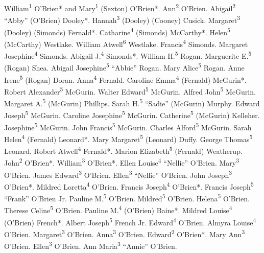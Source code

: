 William\textsuperscript{1} O'Brien* and Mary\textsuperscript{1} (Sexton) O'Brien*.
Ann\textsuperscript{2} O'Brien.
Abigail\textsuperscript{2} ``Abby'' (O'Brien) Dooley*.
Hannah\textsuperscript{3} (Dooley) (Cooney) Cusick.
Margaret\textsuperscript{3} (Dooley) (Simonds) Fernald*.
Catharine\textsuperscript{4} (Simonds) McCarthy*.
Helen\textsuperscript{5} (McCarthy) Westlake.
William Atwell\textsuperscript{6} Westlake.
Francis\textsuperscript{4} Simonds.
Margaret Josephine\textsuperscript{4} Simonds.
Abigail J.\textsuperscript{4} Simonds*.
William H.\textsuperscript{5} Rogan.
Marguerite E.\textsuperscript{5} (Rogan) Shea.
Abigail Josephine\textsuperscript{5} ``Abbie'' Rogan.
Mary Alice\textsuperscript{5} Rogan.
Anne Irene\textsuperscript{5} (Rogan) Doran.
Anna\textsuperscript{4} Fernald.
Caroline Emma\textsuperscript{4} (Fernald) McGurin*.
Robert Alexander\textsuperscript{5} McGurin.
Walter Edward\textsuperscript{5} McGurin.
Alfred John\textsuperscript{5} McGurin.
Margaret A.\textsuperscript{5} (McGurin) Phillips.
Sarah H.\textsuperscript{5} ``Sadie'' (McGurin) Murphy.
Edward Joseph\textsuperscript{5} McGurin.
Caroline Josephine\textsuperscript{5} McGurin.
Catherine\textsuperscript{5} (McGurin) Kelleher.
Josephine\textsuperscript{5} McGurin.
John Francis\textsuperscript{5} McGurin.
Charles Alford\textsuperscript{5} McGurin.
Sarah Helen\textsuperscript{4} (Fernald) Leonard*.
Mary Margaret\textsuperscript{5} (Leonard) Duffy.
George Thomas\textsuperscript{5} Leonard.
Robert Atwell\textsuperscript{4} Fernald*.
Marion Elizabeth\textsuperscript{5} (Fernald) Weatherup.
John\textsuperscript{2} O'Brien*.
William\textsuperscript{3} O'Brien*.
Ellen Louise\textsuperscript{4} ``Nellie'' O'Brien.
Mary\textsuperscript{3} O'Brien.
James Edward\textsuperscript{3} O'Brien.
Ellen\textsuperscript{3} ``Nellie'' O'Brien.
John Joseph\textsuperscript{3} O'Brien*.
Mildred Loretta\textsuperscript{4} O'Brien.
Francis Joseph\textsuperscript{4} O'Brien*.
Francis Joseph\textsuperscript{5} ``Frank'' O'Brien Jr.
Pauline M.\textsuperscript{5} O'Brien.
Mildred\textsuperscript{5} O'Brien.
Helena\textsuperscript{5} O'Brien.
Therese Celine\textsuperscript{5} O'Brien.
Pauline M.\textsuperscript{4} (O'Brien) Baine*.
Mildred Louise\textsuperscript{4} (O'Brien) French*.
Albert Joseph\textsuperscript{5} French Jr.
Edward\textsuperscript{4} O'Brien.
Almyra Louise\textsuperscript{4} O'Brien. 
Margaret\textsuperscript{3} O'Brien.
Anna\textsuperscript{3} O'Brien.
Edward\textsuperscript{2} O'Brien*.
Mary Ann\textsuperscript{3} O'Brien.
Ellen\textsuperscript{3} O'Brien.
Ann Maria\textsuperscript{3} ``Annie'' O'Brien.

